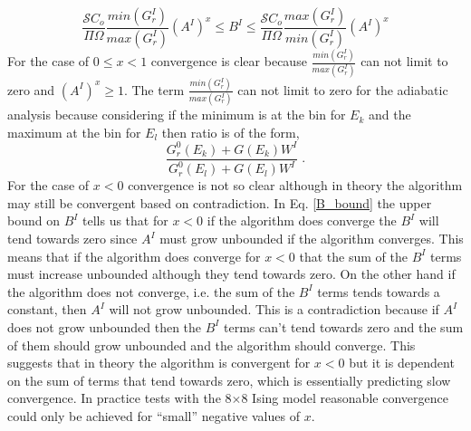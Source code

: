 \documentclass[aps,pre,reprint,superscriptaddress,showkeys]{revtex4-2}
\begin{document}
\begin{equation}
 \frac{\mathcal{S}C_o}{\Pi\Omega} \frac{min(G_r^{I})}{ max(G_r^{I})}(A^I)^x \le B^I  \le  \frac{\mathcal{S}C_o}{\Pi\Omega}\frac{max(G_r^{I})}{ min(G_r^{I})}(A^I)^x
 \label{B_bound}
\end{equation}
For the case of $0\le x < 1 $ convergence is clear because $\frac{min(G_r^{I})}{ max(G_r^{I})}$ can not limit to zero and $(A^I)^x \ge 1$. The term $\frac{min(G_r^{I})}{ max(G_r^{I})}$ can not limit to zero for the adiabatic analysis because considering if the minimum is at the bin for $E_k$ and the maximum at the bin for $E_l$ then ratio is of the form,
\begin{equation}
\frac{G_r^{0}(E_k) + G(E_k)W^I}{G_r^{0}(E_l) + G(E_l)W^I} \;.
\end{equation}
 For the case of $x < 0$ convergence is not so clear although in theory the algorithm may still be convergent based on contradiction. In Eq. \ref{B_bound} the upper bound on $B^I$ tells us that for $x<0$ if the algorithm does converge the $B^I$ will tend towards zero since $A^I$ must grow unbounded if the algorithm converges. This means that if the algorithm does converge for $x<0$ that the sum of the $B^I$ terms must increase unbounded although they tend towards zero. On the other hand if the algorithm does not converge, i.e. the sum of the $B^I$ terms tends towards a constant, then $A^I$ will not grow unbounded. This is a contradiction because if $A^I$ does not grow unbounded then the $B^I$ terms can't tend towards zero and the sum of them should grow unbounded and the algorithm should converge. This suggests that in theory the algorithm is convergent for $x<0$ but it is dependent on the sum of terms that tend towards zero, which is essentially predicting slow convergence. In practice tests with the 8$\times$8 Ising model reasonable convergence could only be achieved for ``small'' negative values of $x$. 
\end{document}

